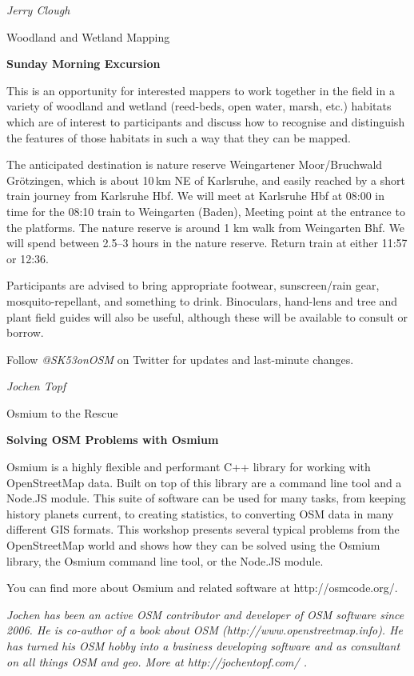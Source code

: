 \newcommand{\sundayabstract}[7]%
{%
\newpage%
\ifthispageodd{\ThisCenterWallPaper{1.0}{sunday_r}}{\ThisCenterWallPaper{1.0}{sunday_l}}
\renewcommand{\talktime}{#1}
\renewcommand{\talkroom}{#2}
\thispagestyle{scrheadings}
\noindent \emph{#3}%
\vspace{0.75em}
{\par\noindent\large \sectfont #4}%
\vspace*{0.35em}%
{\par\noindent\bfseries \normalsize \sectfont #5}
\vspace{1em}
\par\noindent #7 \par%
\vspace*{0.35em}%
{\em{#6}}%
\cropmarkswallpaper%
}


\sundayabstract{8:00}{Amalienstraße}{Jerry Clough}{Woodland and Wetland Mapping}%
{Sunday Morning Excursion}%
{}%
{This is an opportunity for interested mappers to work together in the
field in a variety of woodland and wetland (reed-beds, open water, marsh, etc.) habitats which are of interest to participants and discuss how to recognise and distinguish the features of those habitats in such a way that they can be mapped. 

The anticipated destination is nature reserve Weingar\-tener Moor/Bruchwald Grötzingen, which is about 10\,km NE of Karlsruhe, and easily reached by a short train journey from Karlsruhe Hbf. We will meet at Karlsruhe Hbf at 08:00 in time for the 08:10 train to Weingarten (Baden), Meeting point at the entrance to the platforms. The nature reserve is around 1 km walk from Weingarten Bhf. We will spend between 2.5--3 hours in the nature reserve. Return train at either 11:57 or 12:36.

Participants are advised to bring appropriate footwear, sunscreen/rain gear, mosquito-repellant, and something to drink. Binoculars, hand-lens and tree and plant field guides will also be useful, although these will be available to consult or borrow.

Follow \emph{@SK53onOSM} on Twitter for updates and last-minute changes.
}

\sundayabstract{10:00}{Amalienstraße}{Jochen Topf}{Osmium to the Rescue}%
{Solving OSM Problems with Osmium}%
{Jochen has been an active OSM contributor and developer of OSM software since 2006. He is co-author of a book about OSM (http://www.openstreetmap.info). He has turned his OSM hobby into a business developing software and as consultant on all things OSM and geo. More at http://jochentopf.com/ . }%
{Osmium is a highly flexible and performant C++ library for working with OpenStreetMap data. Built on top of this library are a command line tool and a Node.JS module. This suite of software can be used for many tasks, from keeping history planets current, to creating statistics, to converting OSM data in many different GIS formats. This workshop presents several typical problems from the OpenStreetMap world and shows how they can be solved using the Osmium library, the Osmium command line tool, or the Node.JS module. 

You can find more about Osmium and related software at http://osmcode.org/. }

